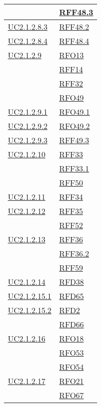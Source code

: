 \begin{longtable}{|>{\centering}m{5cm}|m{5cm}<{\centering}|}
	& \hyperlink{RFF48.3}{RFF48.3}\\ \hline
	\hyperref[UC2.1.2.8.3]{UC2.1.2.8.3} & \hyperlink{RFF48.2}{RFF48.2}\\ \hline
	\hyperref[UC2.1.2.8.4]{UC2.1.2.8.4} & \hyperlink{RFF48.4}{RFF48.4}\\ \hline
	\hyperref[UC2.1.2.9]{UC2.1.2.9} & \hyperlink{RFO13}{RFO13}\\
	& \hyperlink{RFF14}{RFF14}\\
	& \hyperlink{RFF32}{RFF32}\\
	& \hyperlink{RFO49}{RFO49}\\ \hline
	\hyperref[UC2.1.2.9.1]{UC2.1.2.9.1} & \hyperlink{RFO49.1}{RFO49.1}\\ \hline
	\hyperref[UC2.1.2.9.2]{UC2.1.2.9.2} & \hyperlink{RFO49.2}{RFO49.2}\\ \hline
	\hyperref[UC2.1.2.9.3]{UC2.1.2.9.3} & \hyperlink{RFF49.3}{RFF49.3}\\ \hline
	\hyperref[UC2.1.2.10]{UC2.1.2.10} & \hyperlink{RFF33}{RFF33}\\
	& \hyperlink{RFF33.1}{RFF33.1}\\
	& \hyperlink{RFF50}{RFF50}\\ \hline
	\hyperref[UC2.1.2.11]{UC2.1.2.11} & \hyperlink{RFF34}{RFF34}\\ \hline
	\hyperref[UC2.1.2.12]{UC2.1.2.12} & \hyperlink{RFF35}{RFF35}\\
	& \hyperlink{RFF52}{RFF52}\\ \hline
	\hyperref[UC2.1.2.13]{UC2.1.2.13} & \hyperlink{RFF36}{RFF36}\\
	& \hyperlink{RFF36.2}{RFF36.2}\\
	& \hyperlink{RFF59}{RFF59}\\ \hline
	\hyperref[UC2.1.2.14]{UC2.1.2.14} & \hyperlink{RFD38}{RFD38}\\ \hline
	\hyperref[UC2.1.2.15.1]{UC2.1.2.15.1} & \hyperlink{RFD65}{RFD65}\\ \hline
	\hyperref[UC2.1.2.15.2]{UC2.1.2.15.2} & \hyperlink{RFD2}{RFD2}\\
	& \hyperlink{RFD66}{RFD66}\\ \hline
	\hyperref[UC2.1.2.16]{UC2.1.2.16} & \hyperlink{RFO18}{RFO18}\\
	& \hyperlink{RFO53}{RFO53}\\
	& \hyperlink{RFO54}{RFO54}\\ \hline
	\hyperref[UC2.1.2.17]{UC2.1.2.17} & \hyperlink{RFO21}{RFO21}\\
	& \hyperlink{RFO67}{RFO67}\\ \hline

\end{longtable}
